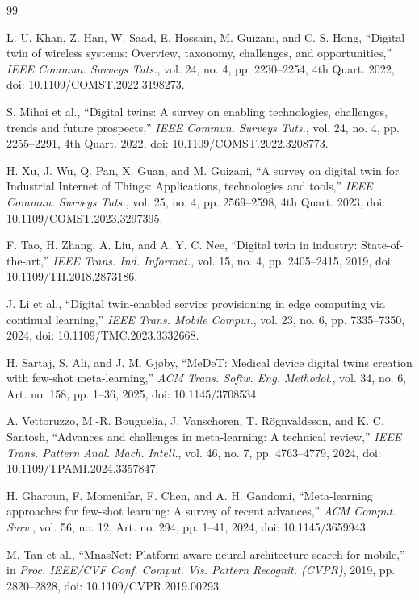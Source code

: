 \documentclass[a4paper,fleqn]{cas-sc}
\begin{document}
\begin{thebibliography}{99}

L. U. Khan, Z. Han, W. Saad, E. Hossain, M. Guizani, and C. S. Hong, ``Digital twin of wireless systems: Overview, taxonomy, challenges, and opportunities,'' \emph{IEEE Commun. Surveys Tuts.}, vol. 24, no. 4, pp. 2230--2254, 4th Quart. 2022, doi: 10.1109/COMST.2022.3198273.

S. Mihai et al., ``Digital twins: A survey on enabling technologies, challenges, trends and future prospects,'' \emph{IEEE Commun. Surveys Tuts.}, vol. 24, no. 4, pp. 2255--2291, 4th Quart. 2022, doi: 10.1109/COMST.2022.3208773.

H. Xu, J. Wu, Q. Pan, X. Guan, and M. Guizani, ``A survey on digital twin for Industrial Internet of Things: Applications, technologies and tools,'' \emph{IEEE Commun. Surveys Tuts.}, vol. 25, no. 4, pp. 2569--2598, 4th Quart. 2023, doi: 10.1109/COMST.2023.3297395.

F. Tao, H. Zhang, A. Liu, and A. Y. C. Nee, ``Digital twin in industry: State-of-the-art,'' \emph{IEEE Trans. Ind. Informat.}, vol. 15, no. 4, pp. 2405--2415, 2019, doi: 10.1109/TII.2018.2873186.

J. Li et al., ``Digital twin-enabled service provisioning in edge computing via continual learning,'' \emph{IEEE Trans. Mobile Comput.}, vol. 23, no. 6, pp. 7335--7350, 2024, doi: 10.1109/TMC.2023.3332668.

H. Sartaj, S. Ali, and J. M. Gj{\o}by, ``MeDeT: Medical device digital twins creation with few-shot meta-learning,'' \emph{ACM Trans. Softw. Eng. Methodol.}, vol. 34, no. 6, Art. no. 158, pp. 1--36, 2025, doi: 10.1145/3708534.

A. Vettoruzzo, M.-R. Bouguelia, J. Vanschoren, T. R{\"o}gnvaldsson, and K. C. Santosh, ``Advances and challenges in meta-learning: A technical review,'' \emph{IEEE Trans. Pattern Anal. Mach. Intell.}, vol. 46, no. 7, pp. 4763--4779, 2024, doi: 10.1109/TPAMI.2024.3357847.

H. Gharoun, F. Momenifar, F. Chen, and A. H. Gandomi, ``Meta-learning approaches for few-shot learning: A survey of recent advances,'' \emph{ACM Comput. Surv.}, vol. 56, no. 12, Art. no. 294, pp. 1--41, 2024, doi: 10.1145/3659943.

M. Tan et al., ``MnasNet: Platform-aware neural architecture search for mobile,'' in \emph{Proc. IEEE/CVF Conf. Comput. Vis. Pattern Recognit. (CVPR)}, 2019, pp. 2820--2828, doi: 10.1109/CVPR.2019.00293.


\end{thebibliography}
\end{document}
